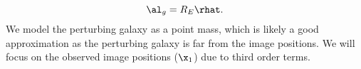 \begin{equation}
\al_g = R_E \rhat.
\end{equation}
We model the perturbing galaxy as a point mass, which is likely a good approximation as the perturbing galaxy is far from the image positions. We will focus on the observed image positions ($\x_1$) due to third order terms.
  
  
  